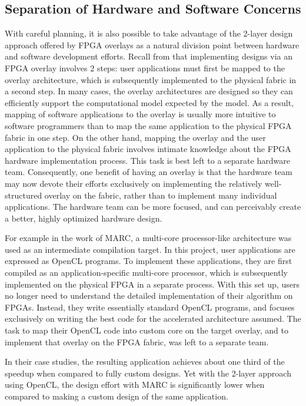 \subsection{Separation of Hardware and Software Concerns}
With careful planning, it is also possible to take advantage of the 2-layer design approach offered by FPGA overlays as a natural division point between hardware and software development efforts.
Recall from  that implementing designs via an FPGA overlay involves 2 steps: user applications must first be mapped to the overlay architecture, which is subsequently implemented to the physical fabric in a second step.
In many cases, the overlay architectures are designed so they can efficiently support the computational model expected by the model.
As a result, mapping of software applications to the overlay is usually more intuitive to software programmers than to map the same application to the physical FPGA fabric in one step.
On the other hand, mapping the overlay and the user application to the physical fabric involves intimate knowledge about the FPGA hardware implementation process.
This task is best left to a separate hardware team.
Consequently, one benefit of having an overlay is that the hardware team may now devote their efforts exclusively on implementing the relatively well-structured overlay on the fabric, rather than to implement many individual applications.
The hardware team can be more focused, and can perceivably create a better, highly optimized hardware design.

For example in the work of MARC\cite{lavin2011}, a multi-core processor-like architecture was used as an intermediate compilation target.
In this project, user applications are expressed as OpenCL programs.
To implement these applications, they are first compiled as an application-specific multi-core processor, which is subsequently implemented on the physical FPGA in a separate process.
With this set up, users no longer need to understand the detailed implementation of their algorithm on FPGAs.
Instead, they write essentially standard OpenCL programs, and focuses exclusively on writing the best code for the accelerated architecture assumed.
The task to map their OpenCL code into custom core on the target overlay, and to implement that overlay on the FPGA fabric, was left to a separate team.

In their case studies, the resulting application achieves about one third of the speedup when compared to fully custom designs.
Yet with the 2-layer approach using OpenCL, the design effort with MARC is significantly lower when compared to making a custom design of the same application.





